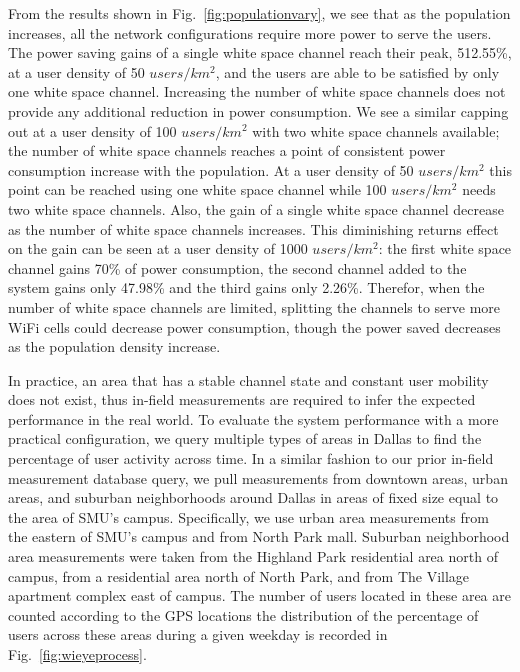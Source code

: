 From the results shown in Fig.~\ref{fig:populationvary}, we see that as the population increases, all the network configurations require more power to serve the users.
The power saving gains of a single white space channel reach their peak, 512.55\%, at a user density of 50 $users/km^2$, and the users are able to be satisfied by only one white space channel. 
Increasing the number of white space channels does not provide any additional reduction in power consumption. 
We see a similar capping out at a user density of 100 $users/km^2$ with two white space channels available; the number of white space channels reaches a point of consistent power consumption increase with the population. 
At a user density of 50 $users/km^2$ this point can be reached using one white space channel while 100 $users/km^2$ needs two white space channels. 
Also, the gain of a single white space channel decrease as the number of white space channels increases.
This diminishing returns effect on the gain can be seen at a user density of 1000 $users/km^2$: the first white space channel gains 70\% of power consumption, the second channel added to the system gains only 47.98\% and the third gains only 2.26\%. 
Therefor, when the number of white space channels are limited, splitting the channels to serve more WiFi cells could decrease power consumption, though the power saved decreases as the population density increase. 


In practice, an area that has a stable channel state and constant user mobility does not exist, thus in-field measurements are required to infer the expected performance in the real world.
To evaluate the system performance with a more practical configuration, we query multiple types of areas in Dallas to find the percentage of user activity across time.
In a similar fashion to our prior in-field measurement database query, we pull measurements from downtown areas, urban areas, and suburban neighborhoods around Dallas in areas of fixed size equal to the area of SMU's campus.
Specifically, we use urban area measurements from the eastern of SMU's campus and from North Park mall. 
Suburban neighborhood area measurements were taken from the Highland Park residential area north of campus, from a residential area north of North Park, and from The Village apartment complex east of campus. 
The number of users located in these area are counted according to the GPS locations the distribution of the percentage of users across these areas during a given weekday is recorded in Fig.~\ref{fig:wieyeprocess}. 


